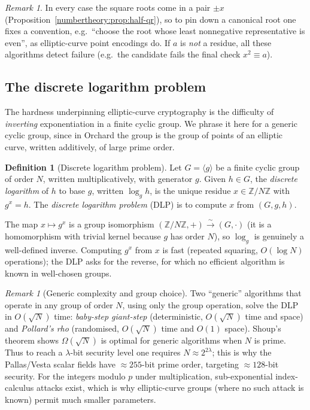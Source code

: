 \documentclass[11pt,a4paper]{article}
\theoremstyle{definition}
\newtheorem{definition}[theorem]{Definition}
\theoremstyle{remark}
\newtheorem{remark}[theorem]{Remark}
\newcommand{\Z}{\ensuremath{\mathbb{Z}}}
\begin{document}
\begin{remark}\label{numbertheory:rem:sqrt-uniqueness}
In every case the square roots come in a pair \(\pm x\) (Proposition~\ref{numbertheory:prop:half-qr}), so to pin down a canonical root one fixes a convention, e.g.\ ``choose the root whose least nonnegative representative is even'', as elliptic-curve point encodings do. If \(a\) is \emph{not} a residue, all these algorithms detect failure (e.g.\ the candidate fails the final check \(x^2 \equiv a\)).
\end{remark}

\subsection{The discrete logarithm problem}\label{numbertheory:subsec:dlog}

The hardness underpinning elliptic-curve cryptography is the difficulty of \emph{inverting} exponentiation in a finite cyclic group. We phrase it here for a generic cyclic group, since in Orchard the group is the group of points of an elliptic curve, written additively, of large prime order.

\begin{definition}[Discrete logarithm problem]\label{numbertheory:def:dlp}
Let \(G = \langle g\rangle\) be a finite cyclic group of order \(N\), written multiplicatively, with generator \(g\). Given \(h \in G\), the \emph{discrete logarithm} of \(h\) to base \(g\), written \(\log_g h\), is the unique residue \(x \in \Z/N\Z\) with \(g^x = h\). The \emph{discrete logarithm problem} (DLP) is to compute \(x\) from \((G,g,h)\).
\end{definition}

The map \(x \mapsto g^x\) is a group isomorphism \((\Z/N\Z, +) \xrightarrow{\sim} (G,\cdot)\) (it is a homomorphism with trivial kernel because \(g\) has order \(N\)), so \(\log_g\) is genuinely a well-defined inverse. Computing \(g^x\) from \(x\) is fast (repeated squaring, \(O(\log N)\) operations); the DLP asks for the reverse, for which no efficient algorithm is known in well-chosen groups.

\begin{remark}[Generic complexity and group choice]\label{numbertheory:rem:dlp-generic}
Two ``generic'' algorithms that operate in any group of order \(N\), using only the group operation, solve the DLP in \(O(\sqrt N)\) time: \emph{baby-step giant-step} (deterministic, \(O(\sqrt N)\) time and space) and \emph{Pollard's rho} (randomised, \(O(\sqrt N)\) time and \(O(1)\) space). Shoup's theorem shows \(\Omega(\sqrt N)\) is optimal for generic algorithms when \(N\) is prime. Thus to reach a \(\lambda\)-bit security level one requires \(N \approx 2^{2\lambda}\); this is why the Pallas/Vesta scalar fields have \(\approx 255\)-bit prime order, targeting \(\approx 128\)-bit security. For the integers modulo \(p\) under multiplication, sub-exponential index-calculus attacks exist, which is why elliptic-curve groups (where no such attack is known) permit much smaller parameters.
\end{remark}
\end{document}
